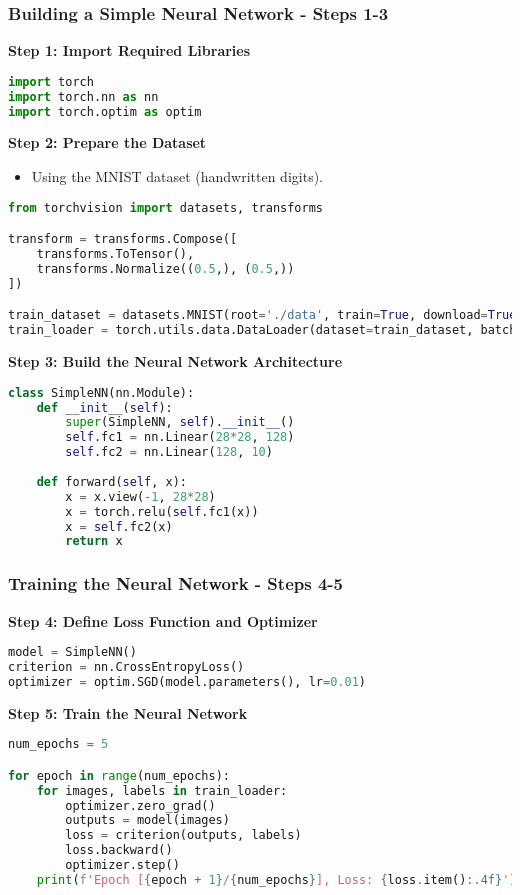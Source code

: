 \documentclass[aspectratio=169]{beamer}
\begin{document}
\begin{frame}[fragile]
    \frametitle{Building a Simple Neural Network - Steps 1-3}
    
    \textbf{Step 1: Import Required Libraries}
    \begin{lstlisting}[language=Python]
import torch
import torch.nn as nn
import torch.optim as optim
    \end{lstlisting}
    
    \textbf{Step 2: Prepare the Dataset}
    \begin{itemize}
        \item Using the MNIST dataset (handwritten digits).
    \end{itemize}
    \begin{lstlisting}[language=Python]
from torchvision import datasets, transforms

transform = transforms.Compose([
    transforms.ToTensor(),
    transforms.Normalize((0.5,), (0.5,))
])

train_dataset = datasets.MNIST(root='./data', train=True, download=True, transform=transform)
train_loader = torch.utils.data.DataLoader(dataset=train_dataset, batch_size=64, shuffle=True)
    \end{lstlisting}

    \textbf{Step 3: Build the Neural Network Architecture}
    \begin{lstlisting}[language=Python]
class SimpleNN(nn.Module):
    def __init__(self):
        super(SimpleNN, self).__init__()
        self.fc1 = nn.Linear(28*28, 128)
        self.fc2 = nn.Linear(128, 10)
    
    def forward(self, x):
        x = x.view(-1, 28*28) 
        x = torch.relu(self.fc1(x))
        x = self.fc2(x)
        return x
    \end{lstlisting}
\end{frame}

\begin{frame}[fragile]
    \frametitle{Training the Neural Network - Steps 4-5}
    
    \textbf{Step 4: Define Loss Function and Optimizer}
    \begin{lstlisting}[language=Python]
model = SimpleNN()
criterion = nn.CrossEntropyLoss()
optimizer = optim.SGD(model.parameters(), lr=0.01)
    \end{lstlisting}

    \textbf{Step 5: Train the Neural Network}
    \begin{lstlisting}[language=Python]
num_epochs = 5

for epoch in range(num_epochs):
    for images, labels in train_loader:
        optimizer.zero_grad()
        outputs = model(images)
        loss = criterion(outputs, labels)
        loss.backward()
        optimizer.step()
    print(f'Epoch [{epoch + 1}/{num_epochs}], Loss: {loss.item():.4f}')
    \end{lstlisting}
\end{frame}
\end{document}
